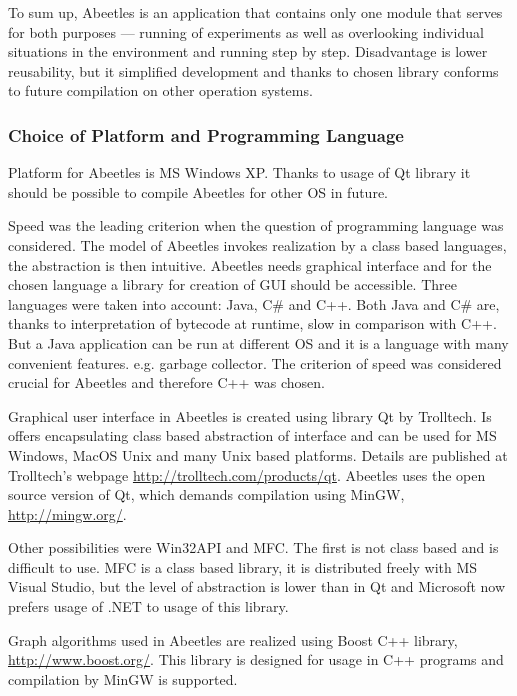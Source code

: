 \documentclass[a4paper,12pt]{report}
\begin{document}
To sum up, Abeetles is an application that contains only one module that serves for both purposes --- running of experiments as well as overlooking individual situations in the environment and running step by step. Disadvantage is lower reusability, but it simplified development and thanks to chosen library conforms to future compilation on other operation systems.

\subsubsection{Choice of Platform and Programming Language}

Platform for Abeetles is MS Windows XP. Thanks to usage of Qt library it should be possible to compile Abeetles for other OS in future.

Speed was the leading criterion when the question of programming language was considered. The model of Abeetles invokes realization by a class based languages, the abstraction is then intuitive. Abeetles needs graphical interface and for the chosen language a library for creation of GUI should be accessible. Three languages were taken into account: Java, C\# and C++. Both Java and C\# are, thanks to interpretation of bytecode at runtime, slow in comparison with C++. But a Java application can be run at different OS and it is a language with many convenient features. e.g. garbage collector. The criterion of speed was considered crucial for Abeetles and therefore C++ was chosen.

Graphical user interface in Abeetles is created using library Qt by Trolltech. Is offers encapsulating class based abstraction of interface and can be used for MS Windows, MacOS Unix and many Unix based platforms. Details are published at Trolltech's webpage \url{http://trolltech.com/products/qt}. Abeetles uses the open source version of Qt, which demands compilation using MinGW, \url{http://mingw.org/}.

Other possibilities were Win32API and MFC. The first is not class based and is difficult to use. MFC is a class based library, it is distributed freely with MS  Visual Studio, but the level of abstraction is lower than in Qt and Microsoft now prefers usage of .NET to usage of this library.

Graph algorithms used in Abeetles are realized using Boost C++ library, \url{http://www.boost.org/}. This library is designed for usage in C++ programs and compilation by MinGW is supported. 
\end{document}
